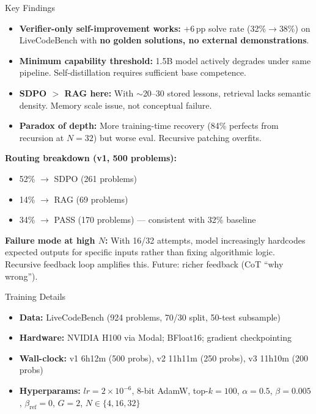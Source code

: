\documentclass[final]{beamer}
\newlength{\colwidth}
\begin{document}
\begin{frame}[t]
\begin{columns}[t]
\begin{column}{\colwidth}

\begin{block}{Key Findings}

\begin{itemize}[]
  \item[\textcolor{cardinalred}{$\bullet$}] \textbf{Verifier-only self-improvement works:} +6\,pp solve rate (32\%$\to$38\%) on LiveCodeBench with \textbf{no golden solutions, no external demonstrations}.
  \item[\textcolor{cardinalred}{$\bullet$}] \textbf{Minimum capability threshold:} 1.5B model actively degrades under same pipeline. Self-distillation requires sufficient base competence.
  \item[\textcolor{cardinalred}{$\bullet$}] \textbf{SDPO $>$ RAG here:} With $\sim$20--30 stored lessons, retrieval lacks semantic density. Memory scale issue, not conceptual failure.
  \item[\textcolor{cardinalred}{$\bullet$}] \textbf{Paradox of depth:} More training-time recovery (84\% perfects from recursion at $N{=}32$) but worse eval. Recursive patching overfits.
\end{itemize}

\textbf{Routing breakdown (v1, 500 problems):}
\begin{itemize}[]
  \item 52\% $\to$ SDPO (261 problems)
  \item 14\% $\to$ RAG (69 problems)
  \item 34\% $\to$ PASS (170 problems) --- consistent with 32\% baseline
\end{itemize}

\textbf{Failure mode at high $N$:} With 16/32 attempts, model increasingly hardcodes expected outputs for specific inputs rather than fixing algorithmic logic. Recursive feedback loop amplifies this. Future: richer feedback (CoT ``why wrong'').

\end{block}

\begin{block}{Training Details}

\begin{itemize}[]
  \item \textbf{Data:} LiveCodeBench (924 problems, 70/30 split, 50-test subsample)
  \item \textbf{Hardware:} NVIDIA H100 via Modal; BFloat16; gradient checkpointing
  \item \textbf{Wall-clock:} v1 6h12m (500 probs), v2 11h11m (250 probs), v3 11h10m (200 probs)
  \item \textbf{Hyperparams:} $lr{=}2{\times}10^{-6}$, 8-bit AdamW, top-$k{=}100$, $\alpha{=}0.5$, $\beta{=}0.005$, $\beta_{\text{ref}}{=}0$, $G{=}2$, $N{\in}\{4,16,32\}$
\end{itemize}


\end{block}
\end{column}
\end{columns}
\end{frame}
\end{document}
